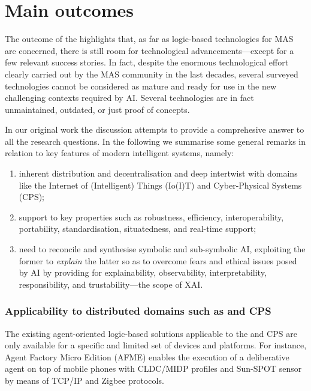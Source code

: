 \documentclass[12pt,a4paper,openright,twoside]{book}
\begin{document}
\section{Main outcomes}\label{sec:outcomes}

The outcome of the \slr{} highlights that, as far as logic-based technologies for MAS are concerned, there is still room for technological advancements---except for a few relevant success stories.
%
In fact, despite the enormous technological effort clearly carried out by the MAS community in the last decades, several surveyed technologies cannot be considered as mature and ready for use in the new challenging contexts required by AI.
%
Several technologies are in fact unmaintained, outdated, or just proof of concepts.

In our original work the discussion attempts to provide a comprehesive answer to all the \slr{} research questions.
%
In the following we summarise some general remarks in relation to key features of modern intelligent systems, namely:
%
\begin{enumerate}[label=\emph{(\roman*)}]
    \item inherent distribution and decentralisation and deep intertwist with domains like the Internet of (Intelligent) Things (Io(I)T) and Cyber-Physical Systems (CPS);
    \item support to key properties such as robustness, efficiency, interoperability, portability, standardisation, situatedness, and real-time support;
    \item need to reconcile and synthesise symbolic and sub-symbolic AI, exploiting the former to \emph{explain} the latter so as to overcome fears and ethical issues posed by AI by providing for explainability, observability, interpretability, responsibility, and trustability---the scope of XAI.
\end{enumerate}

\subsubsection{Applicability to distributed domains such as \iot{} and CPS}

The existing agent-oriented logic-based solutions applicable to the \iot{} and CPS are only available for a specific and limited set of devices and platforms.
%
For instance, Agent Factory Micro Edition (AFME) \cite{afme-iccs2006} enables the execution of a deliberative agent on top of mobile phones with CLDC/MIDP profiles and Sun-SPOT sensor by means of TCP/IP and Zigbee protocols.
\end{document}
